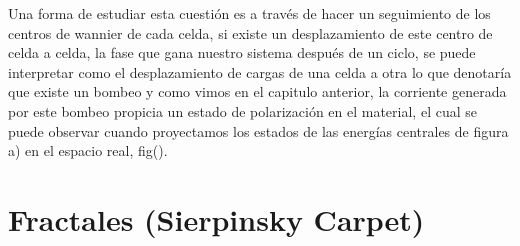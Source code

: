 Una forma de estudiar esta cuestión es a través de hacer un seguimiento de los centros de wannier de cada celda, si existe un desplazamiento de este centro de celda a celda, la fase que gana nuestro sistema después de un ciclo, se puede interpretar como el desplazamiento de cargas de una celda a otra lo que denotaría que existe un bombeo y como vimos en el capitulo anterior, la corriente generada por este bombeo propicia un estado de polarización en el material, el cual se puede observar cuando proyectamos los estados de las energías centrales de figura a) en el espacio real, fig().


\section{Fractales (Sierpinsky Carpet)}

